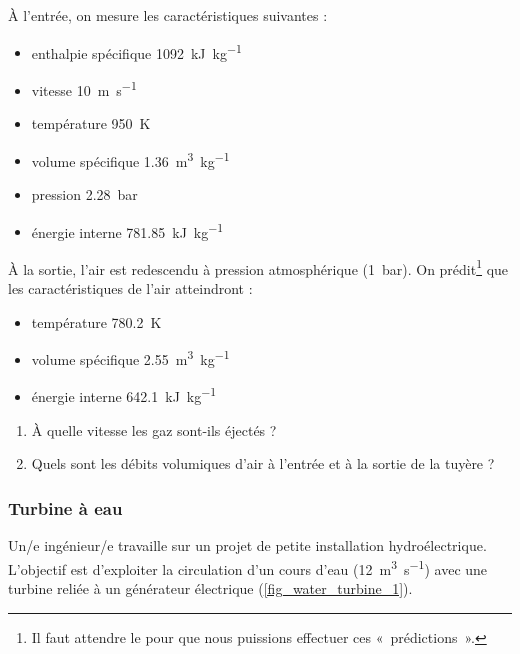 	
	À l’entrée, on mesure les caractéristiques suivantes :
		
	\begin{itemize}
		\item enthalpie spécifique 		\tab \SI{1092}{\kilo\joule\per\kilogram}
		\item vitesse  						\tab \SI{10}{\metre\per\second}
		\item température  					\tab \SI{950}{\kelvin}
		\item volume spécifique  			\tab \SI{1,36}{\metre\cubed\per\kilogram}
		\item pression  						\tab \SI{2,28}{\bar}
		\item énergie interne  				\tab \SI{781,85}{\kilo\joule\per\kilogram}
	\end{itemize}

	À la sortie, l’air est redescendu à pression atmosphérique (\SI{1}{\bar}). On prédit\footnote{Il faut attendre le \coursquatre pour que nous puissions effectuer ces «~prédictions~».} que les caractéristiques de l’air atteindront :
		
	\begin{itemize}
		\item température  				\tab \SI{780,2}{\kelvin}
		\item volume spécifique  		\tab \SI{2,55}{\metre\cubed\per\kilogram}
		\item énergie interne  			\tab \SI{642,1}{\kilo\joule\per\kilogram}
	\end{itemize}


	\begin{enumerate}
		\item À quelle vitesse les gaz sont-ils éjectés ?
		\item Quels sont les débits volumiques d’air à l’entrée et à la sortie de la tuyère ?
	\end{enumerate}
	

\subsubsection{Turbine à eau}
\label{exo_turbine_eau}

	Un/e ingénieur/e travaille sur un projet de petite installation hydroélectrique. L’objectif est d’exploiter la circulation d’un cours d’eau (\SI{12}{\metre\cubed\per\second}) avec une turbine reliée à un générateur électrique (\cref{fig_water_turbine_1}).
	
